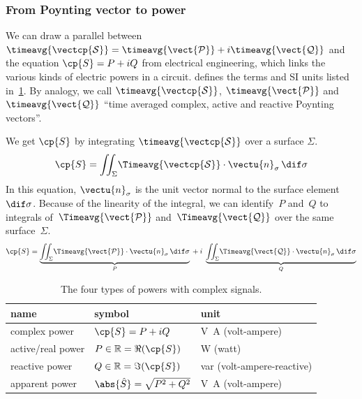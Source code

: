 \begin{refsection}
\subsubsection{From Poynting vector to power}

We can draw a parallel between
$
    \timeavg{\vectcp{\mathcal{S}}}
    =
    \timeavg{\vect{\mathcal{P}}}
    +
    i
    \timeavg{\vect{\mathcal{Q}}}
$
and the equation
$
    \cp{S} = P + iQ
$
from electrical engineering, which links the various kinds of electric powers in a circuit.
\Textcite{IEEE2002dictionary} defines the terms and SI units listed in~\cref{tab:complex_powers}.
By analogy, we call $\timeavg{\vectcp{\mathcal{S}}}$,
$\timeavg{\vect{\mathcal{P}}}$ and
$\timeavg{\vect{\mathcal{Q}}}$ ``time averaged complex, active and reactive Poynting vectors''.

We get $\cp{S}$ by integrating $\timeavg{\vectcp{\mathcal{S}}}$ over a surface $\Sigma$.
\begin{equation}
    \cp{S}
    =
    \iint_\Sigma
    \!
    \Timeavg{\vectcp{\mathcal{S}}}
    \cdot
    \vectu{n}_\sigma
    \,
    \dif\sigma
    \label{eq:complex_power_from_poynting_vector}
\end{equation}
In this equation, $\vectu{n}_\sigma$ is the unit vector normal to the surface element~$\dif\sigma$.
Because of the linearity of the integral, we can identify~$P$ and~$Q$
to integrals of~$\Timeavg{\vect{\mathcal{P}}}$ and~$\Timeavg{\vect{\mathcal{Q}}}$
over the same surface~$\Sigma$.
\begin{equation}
    \cp{S}
    =
    \underbrace{
        \iint_\Sigma
        \!
        \Timeavg{\vect{\mathcal{P}}}
        \cdot
        \vectu{n}_\sigma
        \,
        \dif\sigma
    }_{P}
    \:
    +
    \:
    i
    \;
    \underbrace{
        \iint_\Sigma
        \!
        \Timeavg{\vect{\mathcal{Q}}}
        \cdot
        \vectu{n}_\sigma
        \,
        \dif\sigma
    }_{Q}
    \label{eq:active_reactive_power_from_poynting_vector}
\end{equation}

\begin{table}
    \centering
    \begin{tabular}{lll}
        \toprule
        name & symbol & unit\\
        \midrule
        complex power     & $\cp{S} = P + iQ$\quad & \si{\volt\ampere} (volt-ampere) \\
        active/real power & $P \in \mathbb{R} = \Re(\cp{S})$\quad & \si{\watt} (watt) \\
        reactive power    & $Q \in \mathbb{R} = \Im(\cp{S})$\quad & \si{var} (volt-ampere-reactive) \\
        apparent power    & $\abs{\hat{S}} = \sqrt{P^2 + Q^2}$\quad & \si{\volt\ampere} (volt-ampere) \\
        \bottomrule
    \end{tabular}
    \caption{The four types of powers with complex signals.}
    \label{tab:complex_powers}
\end{table}


\end{refsection}
